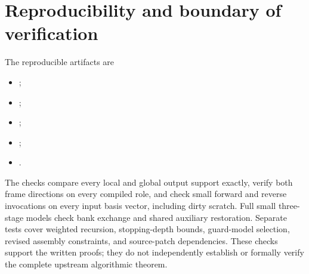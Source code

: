 \documentclass[11pt]{article}
\begin{document}
\section{Reproducibility and boundary of verification}
The reproducible artifacts are
\begin{itemize}
\item {};
\item {};
\item {};
\item {};
\item {}.
\end{itemize}

The checks compare every local and global output support exactly, verify both
frame directions on every compiled role, and check small forward and reverse
invocations on every input basis vector, including dirty scratch. Full small
three-stage models check bank exchange and shared auxiliary restoration.
Separate tests cover weighted recursion, stopping-depth bounds, guard-model
selection, revised assembly constraints, and source-patch dependencies.
These checks support the written proofs; they do not independently establish
or formally verify the complete upstream algorithmic theorem.
\end{document}
